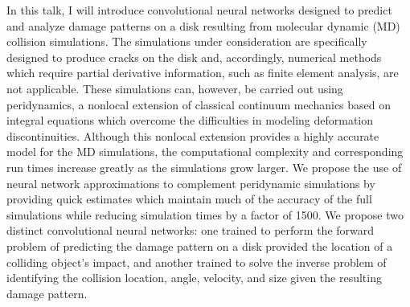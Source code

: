 In this talk, I will introduce convolutional neural networks designed to predict and analyze damage patterns on a disk resulting from molecular dynamic (MD) collision simulations. The simulations under consideration are specifically designed to produce cracks on the disk and, accordingly, numerical methods which require partial derivative information, such as finite element analysis, are not applicable. These simulations can, however, be carried out using peridynamics, a nonlocal extension of classical continuum mechanics based on integral equations which overcome the difficulties in modeling deformation discontinuities. Although this nonlocal extension provides a highly accurate model for the MD simulations, the computational complexity and corresponding run times increase greatly as the simulations grow larger. We propose the use of neural network approximations to complement peridynamic simulations by providing quick estimates which maintain much of the accuracy of the full simulations while reducing simulation times by a factor of 1500. We propose two distinct convolutional neural networks: one trained to perform the forward problem of predicting the damage pattern on a disk provided the location of a colliding object’s impact, and another trained to solve the inverse problem of identifying the collision location, angle, velocity, and size given the resulting damage pattern.

